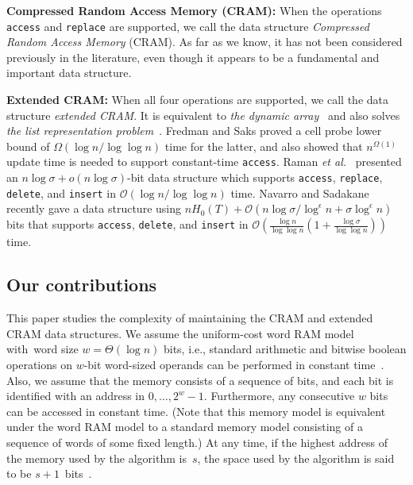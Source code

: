 \documentclass{llncs}
\newcommand{\Order}{\mathcal{O}}
\newcommand{\order}{o}
\begin{document}
\medskip

\noindent
\textbf{Compressed Random Access Memory (CRAM):}
When the operations \texttt{access} and \texttt{replace} are supported,
we call the data structure \emph{Compressed Random Access Memory} (CRAM).
As far as we know, it has not been considered previously in the literature,
even though it appears to be a fundamental and important data structure.

\medskip

\noindent
\textbf{Extended CRAM:}
When all four operations are supported,
we call the data structure \emph{extended CRAM}.
It is equivalent to \emph{the dynamic array}~\cite{RRR_WADS2001}
and also solves
\emph{the list representation problem}~\cite{FredmanS_STOC1989}.
Fredman and Saks \cite{FredmanS_STOC1989} proved
a cell probe lower bound of $\Omega(\log n/ \log \log n)$ time 
for the latter, and also showed that $n^{\Omega(1)}$ update time is needed
to support constant-time \texttt{access}.
Raman \emph{et al.}~\cite{RRR_WADS2001}
presented an $n \log \sigma + \order(n \log \sigma)$-bit data structure
which supports \texttt{access}, \texttt{replace}, \texttt{delete}, and
\texttt{insert} in $\Order(\log n/\log \log n)$ time.
Navarro and Sadakane \cite{NavSad10} recently gave a data structure using
$nH_0(T) + \Order(n\log\sigma/\log^\epsilon n + \sigma \log^\epsilon n)$
bits that supports \texttt{access}, \texttt{delete}, and \texttt{insert}
in $\Order(\frac{\log n}{\log\log n}(1+\frac{\log\sigma}{\log\log n}))$ time.


\subsection{Our contributions}

This paper studies the complexity of maintaining the CRAM and
extended CRAM data structures.
We assume the uniform-cost word RAM model with~word size
$w = \Theta(\log n)$ bits,
i.e., 
standard arithmetic and bitwise boolean operations
on $w$-bit word-sized operands can be performed in constant time~\cite{Hag98}.
Also, we assume that the memory consists of a sequence of
bits, and each bit is identified with an address in $0, \ldots, 2^w-1$.
Furthermore, any consecutive $w$ bits can be accessed in constant time.
(Note that this memory model is equivalent under the word RAM model to
a standard memory model consisting of a sequence of words of some fixed
length.)
At any time, if the highest address of the memory used by the algorithm
is~$s$, the space used by the algorithm is said to be
$s+1$~bits~\cite{HagerupR02}.
\end{document}
